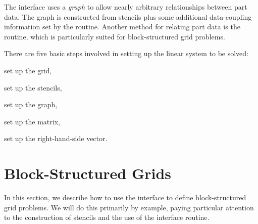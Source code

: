 The  interface uses a {\em graph} to allow nearly arbitrary
relationships between part data.  The graph is constructed from stencils plus
some additional data-coupling information set by the 
routine.  Another method for relating part data is the
 routine, which is particularly suited for
block-structured grid problems.

There are five basic steps involved in setting up the linear system to be
solved:
\begin{list}{.}{\setlength{\itemsep}{0in}}
\item set up the grid,
\item set up the stencils,
\item set up the graph,
\item set up the matrix,
\item set up the right-hand-side vector.
\end{list}


\section{Block-Structured Grids}
\label{sec-Block-Structured-Grids}

In this section, we describe how to use the  interface to
define block-structured grid problems.  We will do this primarily by
example, paying particular attention to the construction of stencils
and the use of the  interface routine.

